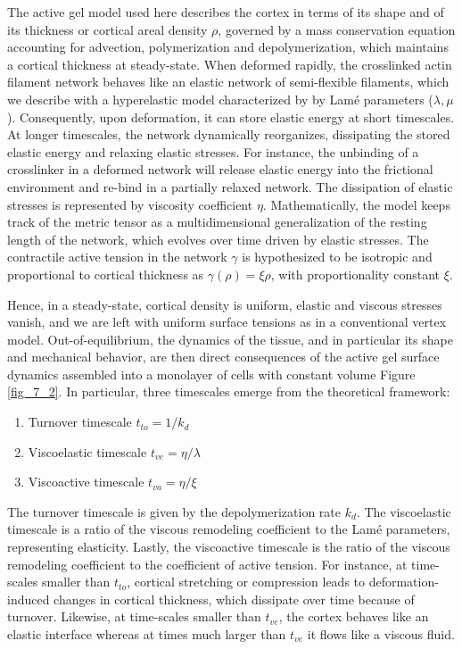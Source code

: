 The active gel model used here describes the cortex in terms of its shape and of its thickness or cortical areal density \(\rho\), governed by a mass conservation equation accounting for advection, polymerization and depolymerization, which maintains a cortical thickness at steady-state. When deformed rapidly, the crosslinked actin filament network behaves like an elastic network of semi-flexible filaments, which we describe with a hyperelastic model characterized by by Lamé parameters  (\(\lambda,\mu\)). Consequently, upon deformation, it can store elastic energy at short timescales. At longer timescales, the network dynamically reorganizes, dissipating the stored elastic energy and relaxing elastic stresses. For instance, the unbinding of a crosslinker in a deformed network will release elastic energy into the frictional environment and re-bind in a partially relaxed network. The dissipation of elastic stresses is represented by viscosity coefficient \(\eta\). Mathematically, the model keeps track of the metric tensor as a multidimensional generalization of the resting length of the network, which evolves over time driven by elastic stresses. The contractile active tension in the network \(\gamma\) is hypothesized to be isotropic and  proportional to cortical thickness as $\gamma(\rho) = \xi \rho$, with proportionality constant  \(\xi\). 

Hence, in a steady-state, cortical density is uniform, elastic and viscous stresses vanish, and we are left with uniform surface tensions as in a conventional vertex model. Out-of-equilibrium, the dynamics of the tissue, and in particular its shape and mechanical behavior, are then direct consequences of the active gel surface dynamics assembled into a monolayer of cells with constant volume Figure \ref{fig_7_2}. In particular, three timescales emerge from the theoretical framework: 
\begin{enumerate}
	\item Turnover timescale \(t_{to} = 1/k_{d}\)
	\item Viscoelastic timescale \(t_{ve} = \eta/\lambda\)
	\item Viscoactive timescale \(t_{va} = \eta/\xi\)
\end{enumerate}

The turnover timescale is given by the depolymerization rate \(k_{d}\). The viscoelastic timescale is a ratio of the viscous remodeling coefficient to the Lamé parameters, representing elasticity. Lastly, the viscoactive timescale is the ratio of the viscous remodeling coefficient to the coefficient of active tension. For instance, at time-scales smaller than $t_{to}$, cortical stretching or compression leads to deformation-induced changes in cortical thickness, which dissipate over time because of turnover. Likewise, at time-scales smaller than $t_{ve}$, the cortex behaves like an elastic interface whereas at times much larger than $t_{ve}$ it flows like a viscous fluid. 

